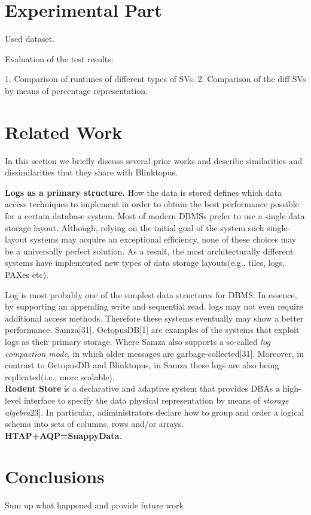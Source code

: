 \documentclass[10pt, conference, compsocconf]{IEEEtran}
\begin{document}
\section{Experimental Part}

Used dataset.

Evaluation of the test results:
 
1. Comparison of runtimes of different types of SVs.
2. Comparison of the diff SVs by means of percentage representation.

\section{Related Work}
In this section we briefly discuss several prior works and describe similarities and dissimilarities that they share with Blinktopus.

\textbf{Logs as a primary structure.} How the data is stored defines which data access techniques to implement in order to obtain the best performance possible for a certain database system. Most of modern DBMSs prefer to use a single data storage layout. Although, relying on the initial goal of the system such single-layout systems may acquire an exceptional efficiency, none of these choices may be a universally perfect solution. As a result, the most architecturally different systems have implemented new types of data storage layouts(e.g., tiles, logs, PAXes etc). 

Log is most probably one of the simplest data structures for DBMS. In essence, by supporting an appending write and sequential read, logs may not even require additional access methods. Therefore these systems eventually may show a better performance. Samza[31], OctopusDB[1] are examples of the systems that exploit logs as their primary storage. Where Samza also supports a so-called \textit{log compaction mode}, in which older messages are garbage-collected[31]. Moreover, in contrast to OctopusDB and Blinktopus, in Samza these logs are also being replicated(i.e., more scalable).\\
\textbf{Rodent Store} is a declarative and adaptive system that provides DBAs a high-level interface to specify the data physical representation by means of \textit{storage algebra}23]. In particular, adiministrators declare how to group and order a logical schema into sets of columns, rows and/or arrays. \\
\textbf{HTAP+AQP=SnappyData}.\\


\section{Conclusions}
Sum up what happened and provide future work
\end{document}
